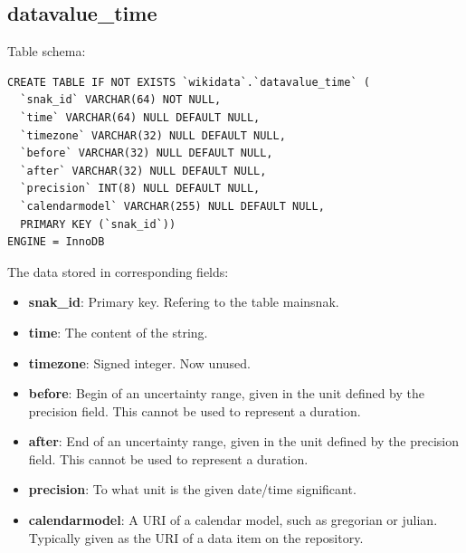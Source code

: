 \documentclass[12pt]{article}
\begin{document}
\subsection{datavalue\_time}
\lstset{language=SQL}
Table schema:
\begin{lstlisting}
CREATE TABLE IF NOT EXISTS `wikidata`.`datavalue_time` (
  `snak_id` VARCHAR(64) NOT NULL,
  `time` VARCHAR(64) NULL DEFAULT NULL,
  `timezone` VARCHAR(32) NULL DEFAULT NULL,
  `before` VARCHAR(32) NULL DEFAULT NULL,
  `after` VARCHAR(32) NULL DEFAULT NULL,
  `precision` INT(8) NULL DEFAULT NULL,
  `calendarmodel` VARCHAR(255) NULL DEFAULT NULL,
  PRIMARY KEY (`snak_id`))
ENGINE = InnoDB
\end{lstlisting}
The data stored in corresponding fields:
\begin{itemize}
\item \textbf{snak\_id}: Primary key. Refering to the table mainsnak.
\item \textbf{time}: The content of the string.
\item \textbf{timezone}: Signed integer. Now unused.
\item \textbf{before}: Begin of an uncertainty range, given in the unit defined by the precision field. This cannot be used to represent a duration.
\item \textbf{after}: End of an uncertainty range, given in the unit defined by the precision field. This cannot be used to represent a duration.
\item \textbf{precision}: To what unit is the given date/time significant.
\item \textbf{calendarmodel}: A URI of a calendar model, such as gregorian or julian. Typically given as the URI of a data item on the repository.
\end{itemize}
\end{document}
